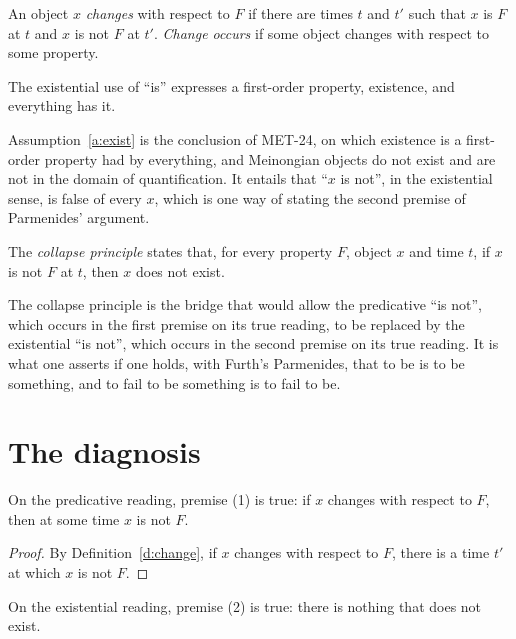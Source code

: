 \documentclass{situationist-preprint}
\begin{document}
\begin{definition}[Change]\label{d:change}
An object $x$ \emph{changes} with respect to $F$ if there are times $t$ and $t'$ such that $x$ is $F$ at $t$ and $x$ is not $F$ at $t'$. \emph{Change occurs} if some object changes with respect to some property.
\end{definition}

\begin{assumption}\label{a:exist}
The existential use of \enquote{is} expresses a first-order property, existence, and everything has it.
\end{assumption}

Assumption~\ref{a:exist} is the conclusion of MET-24, on which existence is a first-order property had by everything, and Meinongian objects do not exist and are not in the domain of quantification. It entails that \enquote{$x$ is not}, in the existential sense, is false of every $x$, which is one way of stating the second premise of Parmenides' argument.

\begin{definition}[Collapse]\label{d:collapse}
The \emph{collapse principle} states that, for every property $F$, object $x$ and time $t$, if $x$ is not $F$ at $t$, then $x$ does not exist.
\end{definition}

The collapse principle is the bridge that would allow the predicative \enquote{is not}, which occurs in the first premise on its true reading, to be replaced by the existential \enquote{is not}, which occurs in the second premise on its true reading. It is what one asserts if one holds, with Furth's Parmenides, that to be is to be something, and to fail to be something is to fail to be.

\section{The diagnosis}

\begin{lemma}\label{l:pred}
On the predicative reading, premise (1) is true: if $x$ changes with respect to $F$, then at some time $x$ is not $F$.
\end{lemma}

\begin{proof}
By Definition~\ref{d:change}, if $x$ changes with respect to $F$, there is a time $t'$ at which $x$ is not $F$.
\end{proof}

\begin{lemma}\label{l:exist}
On the existential reading, premise (2) is true: there is nothing that does not exist.
\end{lemma}
\end{document}
